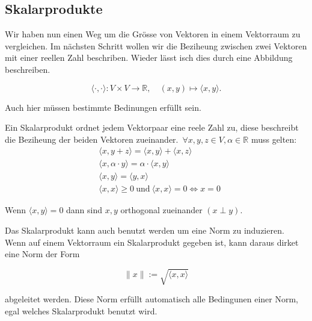 \subsection{Skalarprodukte}

Wir haben nun einen Weg um die Grösse von Vektoren in einem Vektorraum zu vergleichen. Im nächsten Schritt wollen wir die Beziheung zwischen zwei Vektoren mit einer reellen Zahl beschriben. Wieder lässt isch dies durch eine Abbildung beschreiben. 

\begin{equation*}
    \langle \cdot, \cdot \rangle : V \times V \rightarrow \mathbb{R}, \quad (x, y) \mapsto \langle x, y \rangle.
\end{equation*}

\vspace{0.5\baselineskip}

Auch hier müssen bestimmte Bedinungen erfüllt sein.

\begin{tcolorbox}[colback=gray!30, colframe=gray!80, title=Skalarprodukte]
    Ein Skalarprodukt ordnet jedem Vektorpaar eine reele Zahl zu, diese beschreibt die Beziheung der beiden Vektoren zueinander.\ \( \forall x, y, z \in V, \alpha \in \mathbb{R} \) muss gelten:
    \begin{equation*}
        \begin{aligned}
            & \langle x, y + z \rangle = \langle x, y \rangle + \langle x, z \rangle \\[0.5em]
            & \langle x, \alpha \cdot y \rangle = \alpha \cdot \langle x, y \rangle \\[0.5em]
            & \langle x, y \rangle = \langle y, x \rangle \\[0.5em]
            & \langle x, x \rangle \geq 0 \ \text{und} \ \langle x, x \rangle = 0 \Leftrightarrow x = 0
        \end{aligned}
    \end{equation*}
\end{tcolorbox}

\vspace{0.5\baselineskip}

Wenn \( \langle x, y \rangle = 0 \) dann sind \( x, y \) orthogonal zueinander \( (x \perp y) \). 

\vspace{1\baselineskip}

Das Skalarprodukt kann auch benutzt werden um eine Norm zu induzieren. Wenn auf einem Vektorraum ein Skalarprodukt gegeben ist, kann daraus dirket eine Norm der Form

\begin{equation*}
    \| x \| := \sqrt{\langle x, x \rangle}
\end{equation*}

abgeleitet werden. Diese Norm erfüllt automatisch alle Bedingunen einer Norm, egal welches Skalarprodukt benutzt wird. 
